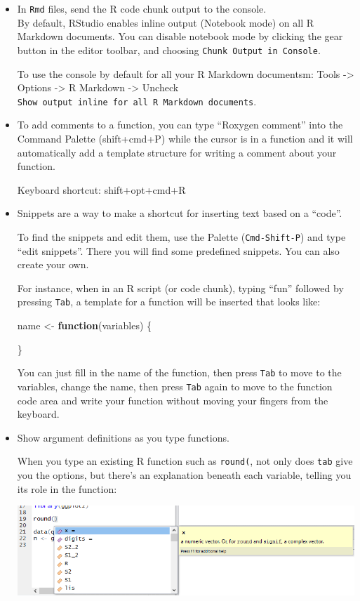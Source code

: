 \documentclass[
  a4paper,
  twoside,
  openright]{book}
\newenvironment{Shaded}{\begin{snugshade}}{\end{snugshade}}
\newcommand{\ControlFlowTok}[1]{\textcolor[rgb]{0.13,0.29,0.53}{\textbf{#1}}}
\newcommand{\NormalTok}[1]{#1}
\newcommand{\OtherTok}[1]{\textcolor[rgb]{0.56,0.35,0.01}{#1}}
\theoremstyle{definition}
\theoremstyle{definition}
\theoremstyle{definition}
\theoremstyle{definition}
\theoremstyle{remark}
\begin{document}
\begin{itemize}
\item
  In \texttt{Rmd} files, send the R code chunk output to the console.\\
  By default, RStudio enables inline output (Notebook mode) on all R Markdown documents. You can disable notebook mode by clicking the gear button in the editor toolbar, and choosing \texttt{Chunk\ Output\ in\ Console}.

  To use the console by default for all your R Markdown documentsm: Tools -\textgreater{} Options -\textgreater{} R Markdown -\textgreater{} Uncheck \texttt{Show\ output\ inline\ for\ all\ R\ Markdown\ documents}.
\item
  To add comments to a function, you can type ``Roxygen comment'' into the Command Palette (shift+cmd+P) while the cursor is in a function and it will automatically add a template structure for writing a comment about your function.

  Keyboard shortcut: shift+opt+cmd+R
\item
  Snippets are a way to make a shortcut for inserting text based on a ``code''.

  To find the snippets and edit them, use the Palette (\texttt{Cmd-Shift-P}) and type ``edit snippets''. There you will find some predefined snippets. You can also create your own.

  For instance, when in an R script (or code chunk), typing ``fun'' followed by pressing \texttt{Tab}, a template for a function will be inserted that looks like:

\begin{Shaded}
\begin{Highlighting}[]
\NormalTok{name }\OtherTok{\textless{}{-}} \ControlFlowTok{function}\NormalTok{(variables) \{}

\NormalTok{\}}
\end{Highlighting}
\end{Shaded}

  You can just fill in the name of the function, then press \texttt{Tab} to move to the variables, change the name, then press \texttt{Tab} again to move to the function code area and write your function without moving your fingers from the keyboard.
\item
  Show argument definitions as you type functions.

  When you type an existing R function such as \texttt{round(}, not only does {\texttt{tab}} give you the options, but there's an explanation beneath each variable, telling you its role in the function:

  \includegraphics[width=1\linewidth]{images/func help}
\end{itemize}
\end{document}
